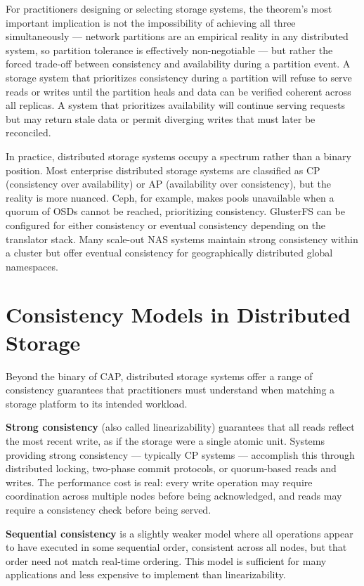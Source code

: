 For practitioners designing or selecting storage systems, the theorem's most important implication is not the impossibility of achieving all three simultaneously --- network partitions are an empirical reality in any distributed system, so partition tolerance is effectively non-negotiable --- but rather the forced trade-off between consistency and availability during a partition event. A storage system that prioritizes consistency during a partition will refuse to serve reads or writes until the partition heals and data can be verified coherent across all replicas. A system that prioritizes availability will continue serving requests but may return stale data or permit diverging writes that must later be reconciled.

In practice, distributed storage systems occupy a spectrum rather than a binary position. Most enterprise distributed storage systems are classified as CP (consistency over availability) or AP (availability over consistency), but the reality is more nuanced. Ceph, for example, makes pools unavailable when a quorum of OSDs cannot be reached, prioritizing consistency. GlusterFS can be configured for either consistency or eventual consistency depending on the translator stack. Many scale-out NAS systems maintain strong consistency within a cluster but offer eventual consistency for geographically distributed global namespaces.

\section{Consistency Models in Distributed Storage}
Beyond the binary of CAP, distributed storage systems offer a range of consistency guarantees that practitioners must understand when matching a storage platform to its intended workload.

\textbf{Strong consistency} (also called linearizability) guarantees that all reads reflect the most recent write, as if the storage were a single atomic unit. Systems providing strong consistency --- typically CP systems --- accomplish this through distributed locking, two-phase commit protocols, or quorum-based reads and writes. The performance cost is real: every write operation may require coordination across multiple nodes before being acknowledged, and reads may require a consistency check before being served.

\textbf{Sequential consistency} is a slightly weaker model where all operations appear to have executed in some sequential order, consistent across all nodes, but that order need not match real-time ordering. This model is sufficient for many applications and less expensive to implement than linearizability.

